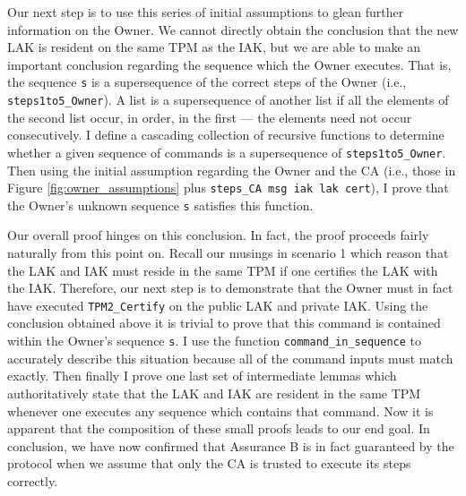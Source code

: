 Our next step is to use this series of initial assumptions to glean further information on the Owner. We cannot directly obtain the conclusion that the new LAK is resident on the same TPM as the IAK, but we are able to make an important conclusion regarding the sequence which the Owner executes. That is, the sequence \verb|s| is a supersequence of the correct steps of the Owner (i.e., \verb|steps1to5_Owner|). A list is a supersequence of another list if all the elements of the second list occur, in order, in the first --- the elements need not occur consecutively. I define a cascading collection of recursive functions to determine whether a given sequence of commands is a supersequence of \verb|steps1to5_Owner|. 
Then using the initial assumption regarding the Owner and the CA (i.e., those in Figure \ref{fig:owner_assumptions}
plus \verb|steps_CA msg iak lak cert|), I prove that the Owner's unknown sequence \verb|s| satisfies this function. 


Our overall proof hinges on this conclusion. In fact, the proof proceeds fairly naturally from this point on. Recall our musings in scenario 1 which reason that the LAK and IAK must reside in the same TPM if one certifies the LAK with the IAK. Therefore, our next step is to demonstrate that the Owner must in fact have executed \verb|TPM2_Certify| on the public LAK and private IAK. 
Using the conclusion obtained above it is trivial to prove that this command is contained within the Owner's sequence \verb|s|.
I use the function \verb|command_in_sequence| to accurately describe this situation because all of the command inputs must match exactly. 
Then finally I prove one last set of intermediate lemmas which authoritatively state that the LAK and IAK are resident in the same TPM whenever one executes any sequence which contains that command.
Now it is apparent that the composition of these small proofs leads to our end goal.
In conclusion, we have now confirmed that Assurance B is in fact guaranteed by the protocol when we assume that only the CA is trusted to execute its steps correctly. 






